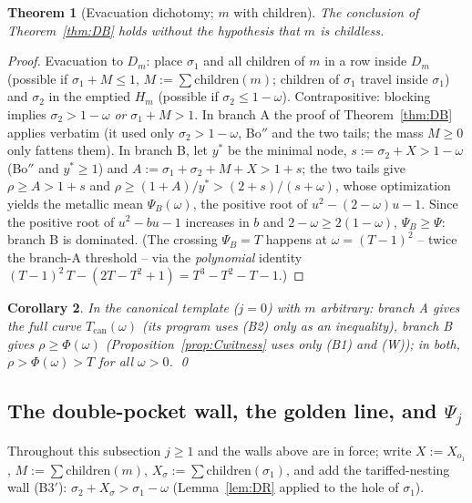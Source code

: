 \documentclass[11pt]{article}
\newtheorem{theorem}{Theorem}
\newtheorem{corollary}[theorem]{Corollary}
\theoremstyle{definition}
\begin{document}
\begin{theorem}[Evacuation dichotomy; $m$ with children]\label{thm:DBpp}
The conclusion of Theorem~\ref{thm:DB} holds without the hypothesis that
$m$ is childless.
\end{theorem}
\begin{proof}
Evacuation to $D_m$: place $\sigma_1$ and all children of $m$ in a row
inside $D_m$ (possible if $\sigma_1+M\le1$, $M:=\sum\mathrm{children}(m)$;
children of $\sigma_1$ travel inside $\sigma_1$) and $\sigma_2$ in the
emptied $H_m$ (possible if $\sigma_2\le1-\omega$). Contrapositive:
blocking implies $\sigma_2>1-\omega$ \emph{or} $\sigma_1+M>1$. In branch A
the proof of Theorem~\ref{thm:DB} applies verbatim (it used only
$\sigma_2>1-\omega$, Bo$''$ and the two tails; the mass $M\ge0$ only
fattens them). In branch B, let $y^*$ be the minimal node,
$s:=\sigma_2+X>1-\omega$ (Bo$''$ and $y^*\ge1$) and
$A:=\sigma_1+\sigma_2+M+X>1+s$; the two tails give $\rho\ge A>1+s$ and
$\rho\ge(1+A)/y^*>(2+s)/(s+\omega)$, whose optimization yields the
metallic mean $\Psi_B(\omega)$, the positive root of $u^2-(2-\omega)u-1$.
Since the positive root of $u^2-bu-1$ increases in $b$ and
$2-\omega\ge2(1-\omega)$, $\Psi_B\ge\Psi$: branch B is dominated. (The
crossing $\Psi_B=T$ happens at $\omega=(T-1)^2$ -- twice the branch-A
threshold -- via the \emph{polynomial} identity
$(T-1)^2\,T-(2T-T^2+1)=T^3-T^2-T-1$.)
\end{proof}

\begin{corollary}\label{cor:DB2}
In the canonical template ($j=0$) with $m$ arbitrary: branch A gives the
full curve $T_{\mathrm{can}}(\omega)$ (its program uses (B2) only as an
inequality), branch B gives $\rho\ge\Phi(\omega)$
(Proposition~\ref{prop:Cwitness} uses only (B1) and (W)); in both,
$\rho>\Phi(\omega)>T$ for all $\omega>0$. \qed
\end{corollary}

\subsection{The double-pocket wall, the golden line, and \texorpdfstring{$\Psi_j$}{Psi j}}
\label{app:pocket-app}

Throughout this subsection $j\ge1$ and the walls above are in force; write
$X:=X_{o_1}$, $M:=\sum\mathrm{children}(m)$,
$X_\sigma:=\sum\mathrm{children}(\sigma_1)$, and add the tariffed-nesting
wall (B3$'$): $\sigma_2+X_\sigma>\sigma_1-\omega$ (Lemma~\ref{lem:DR}
applied to the hole of $\sigma_1$).
\end{document}
